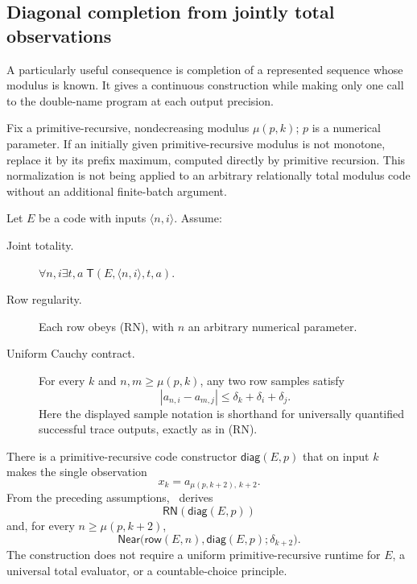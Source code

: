 \subsection{Diagonal completion from jointly total observations}

A particularly useful consequence is completion of a represented sequence
whose modulus is known. It gives a continuous construction while making only
one call to the double-name program at each output precision.

Fix a primitive-recursive, nondecreasing modulus $\mu(p,k)$; $p$ is a
numerical parameter. If an initially given primitive-recursive modulus is
not monotone, replace it by its prefix maximum, computed directly by
primitive recursion. This normalization is not being applied to an arbitrary
relationally total modulus code without an additional finite-batch argument.

Let $E$ be a code with inputs $\langle n,i\rangle$. Assume:
\begin{description}
\item[Joint totality.]
$\forall n,i\exists t,a\;\mathsf T(E,\langle n,i\rangle,t,a)$.
\item[Row regularity.]
Each row obeys (RN), with $n$ an arbitrary numerical parameter.
\item[Uniform Cauchy contract.]
For every $k$ and $n,m\geq\mu(p,k)$, any two row samples satisfy
\[
 \left|a_{n,i}-a_{m,j}\right|
      \leq\delta_k+\delta_i+\delta_j.
 \tag{UC}
\]
Here the displayed sample notation is shorthand for universally quantified
successful trace outputs, exactly as in (RN).
\end{description}

\begin{theorem}
\label{thm:relational-completion}
There is a primitive-recursive code constructor $\mathsf{diag}(E,p)$ that
on input $k$ makes the single observation
\[
       x_k=a_{\mu(p,k+2),\,k+2}.
 \tag{D}
\]
From the preceding assumptions, \ipra\ derives
\[
 \mathsf{RN}(\mathsf{diag}(E,p))
 \tag{D1}
\]
and, for every $n\geq\mu(p,k+2)$,
\[
 \mathsf{Near}\bigl(\mathsf{row}(E,n),
                    \mathsf{diag}(E,p);\delta_{k+2}\bigr).
 \tag{D2}
\]
The construction does not require a uniform primitive-recursive runtime for
$E$, a universal total evaluator, or a countable-choice principle.
\end{theorem}

